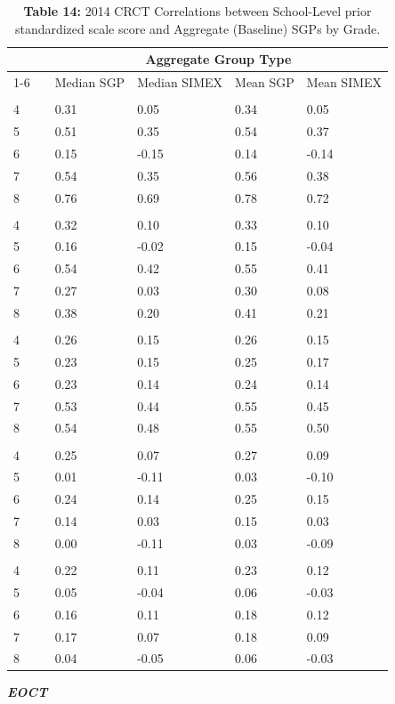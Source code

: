 \documentclass[12pt]{article}
\begin{document}
\begin{table}[H]
\caption*{\textbf{Table 14:} 2014 CRCT Correlations between School-Level prior standardized scale score and Aggregate (Baseline) SGPs by Grade.\label{table14}} 
\begin{center}
\begin{tabular}{lcllll}
\hline\hline
\multicolumn{1}{c}{\bfseries }&\multicolumn{1}{c}{\bfseries }&\multicolumn{4}{c}{\bfseries Aggregate Group Type}\tabularnewline
\cline{1-6}
\multicolumn{1}{c}{Grade}&\multicolumn{1}{c}{}&\multicolumn{1}{c}{Median SGP}&\multicolumn{1}{c}{Median SIMEX}&\multicolumn{1}{c}{Mean SGP}&\multicolumn{1}{c}{Mean SIMEX}\tabularnewline
\hline
&&&&&\tabularnewline
4&&0.31& 0.05&0.34& 0.05\tabularnewline
5&&0.51& 0.35&0.54& 0.37\tabularnewline
6&&0.15&-0.15&0.14&-0.14\tabularnewline
7&&0.54& 0.35&0.56& 0.38\tabularnewline
8&&0.76& 0.69&0.78& 0.72\tabularnewline
\hline
&&&&&\tabularnewline
4&&0.32& 0.10&0.33& 0.10\tabularnewline
5&&0.16&-0.02&0.15&-0.04\tabularnewline
6&&0.54& 0.42&0.55& 0.41\tabularnewline
7&&0.27& 0.03&0.30& 0.08\tabularnewline
8&&0.38& 0.20&0.41& 0.21\tabularnewline
\hline
&&&&&\tabularnewline
4&&0.26& 0.15&0.26& 0.15\tabularnewline
5&&0.23& 0.15&0.25& 0.17\tabularnewline
6&&0.23& 0.14&0.24& 0.14\tabularnewline
7&&0.53& 0.44&0.55& 0.45\tabularnewline
8&&0.54& 0.48&0.55& 0.50\tabularnewline
\hline
&&&&&\tabularnewline
4&&0.25& 0.07&0.27& 0.09\tabularnewline
5&&0.01&-0.11&0.03&-0.10\tabularnewline
6&&0.24& 0.14&0.25& 0.15\tabularnewline
7&&0.14& 0.03&0.15& 0.03\tabularnewline
8&&0.00&-0.11&0.03&-0.09\tabularnewline
\hline
&&&&&\tabularnewline
4&&0.22& 0.11&0.23& 0.12\tabularnewline
5&&0.05&-0.04&0.06&-0.03\tabularnewline
6&&0.16& 0.11&0.18& 0.12\tabularnewline
7&&0.17& 0.07&0.18& 0.09\tabularnewline
8&&0.04&-0.05&0.06&-0.03\tabularnewline
\hline
\end{tabular}\end{center}

\end{table}

\textbf{\emph{EOCT}}
\end{document}
